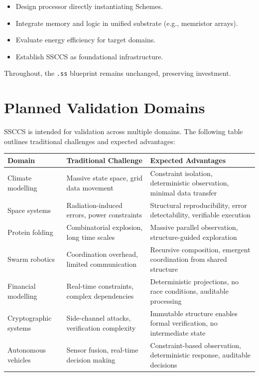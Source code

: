 \documentclass[
  a4paper,
  DIV=11,
  numbers=noendperiod]{scrartcl}
\providecommand{\tightlist}{%
  \setlength{\itemsep}{0pt}\setlength{\parskip}{0pt}}
\begin{document}
\begin{itemize}
\tightlist
\item
  Design processor directly instantiating Schemes.
\item
  Integrate memory and logic in unified substrate (e.g., memristor
  arrays).
\item
  Evaluate energy efficiency for target domains.
\item
  Establish SSCCS as foundational infrastructure.
\end{itemize}

Throughout, the \texttt{.ss} blueprint remains unchanged, preserving
investment.

\section{Planned Validation Domains}\label{planned-validation-domains}

SSCCS is intended for validation across multiple domains. The following
table outlines traditional challenges and expected advantages:

\begin{longtable}[]{@{}
  >{\raggedright\arraybackslash}p{}
  >{\raggedright\arraybackslash}p{}
  >{\raggedright\arraybackslash}p{}@{}}
\toprule\noalign{}
\begin{minipage}[b]{\linewidth}\raggedright
Domain
\end{minipage} & \begin{minipage}[b]{\linewidth}\raggedright
Traditional Challenge
\end{minipage} & \begin{minipage}[b]{\linewidth}\raggedright
Expected Advantages
\end{minipage} \\
\midrule\noalign{}
\endhead
\bottomrule\noalign{}
\endlastfoot
Climate modelling & Massive state space, grid data movement & Constraint
isolation, deterministic observation, minimal data transfer \\
Space systems & Radiation-induced errors, power constraints & Structural
reproducibility, error detectability, verifiable execution \\
Protein folding & Combinatorial explosion, long time scales & Massive
parallel observation, structure-guided exploration \\
Swarm robotics & Coordination overhead, limited communication &
Recursive composition, emergent coordination from shared structure \\
Financial modelling & Real-time constraints, complex dependencies &
Deterministic projections, no race conditions, auditable processing \\
Cryptographic systems & Side-channel attacks, verification complexity &
Immutable structure enables formal verification, no intermediate
state \\
Autonomous vehicles & Sensor fusion, real-time decision making &
Constraint-based observation, deterministic response, auditable
decisions \\
\end{longtable}
\end{document}
